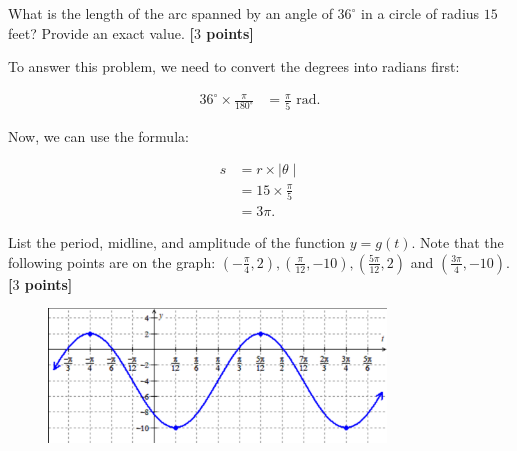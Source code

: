 \newpage

\begin{problem}
  What is the length of the arc spanned by an angle of $36^{\circ}$ in a circle
  of radius $15$ feet? Provide an exact value. \textbf{[$3$ points]}
\end{problem}

\begin{solution}
  To answer this problem, we need to convert the degrees into radians first:

  \begin{align*}
    36^{\circ} \times \frac{\pi}{180^{\circ}} &= \frac{\pi}{5} \textrm{ rad}
  .\end{align*}

  Now, we can use the formula:

  \begin{align*}
    s &= r \times \mid \theta \mid \\
      &= 15 \times \frac{\pi}{5} \\
      &= \boxed{3\pi}
  .\end{align*}
\end{solution}

\newpage

\begin{problem}
  List the period, midline, and amplitude of the function $y = g(t)$. Note that
  the following points are on the graph:
  $\left(-\frac{\pi}{4}, 2\right), \left(\frac{\pi}{12}, -10\right),
  \left(\frac{5\pi}{12}, 2\right)$ and $\left(\frac{3\pi}{4}, -10\right)$.
  \textbf{[$3$ points]}
\end{problem}

\begin{figure}[H]
  \centering
  \includegraphics[width=0.8\textwidth]{images/week-1.png}
  \caption{}
  \label{fig:week_1}
\end{figure}

